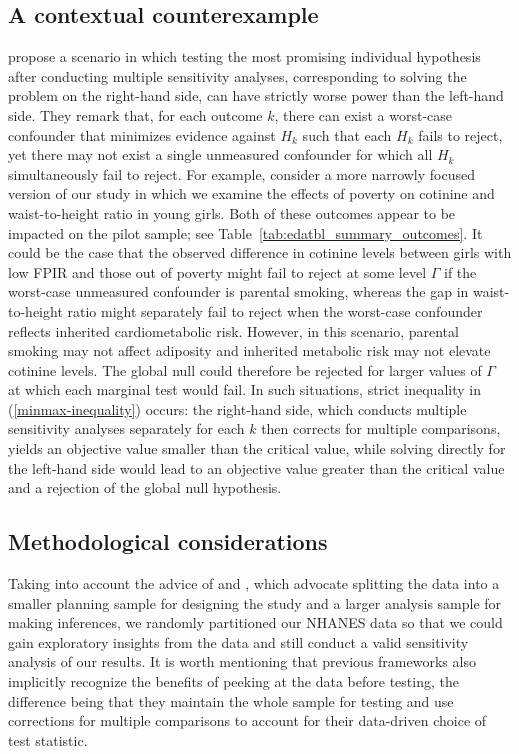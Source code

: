 \documentclass[12pt,leqno,titlepage]{amsart}
\newcommand{\1}{\mathbbm{1}}
\begin{document}
\begin{bibunit}
\subsection{A contextual counterexample}

\cite{fogarty2016sensitivity} propose a scenario in which testing the most promising individual hypothesis after conducting multiple sensitivity analyses, corresponding to solving the problem on the right-hand side, can have strictly worse power than the left-hand side. They remark that, for each outcome $k$, there can exist a worst-case confounder that minimizes evidence against $H_k$ such that each $H_k$ fails to reject, yet there may not exist a single unmeasured confounder for which all $H_k$ simultaneously fail to reject. For example, consider a more narrowly focused version of our study in which we examine the effects of poverty on cotinine and waist-to-height ratio in young girls. Both of these outcomes appear to be impacted on the pilot sample; see Table~\ref{tab:edatbl_summary_outcomes}. It could be the case that the observed difference in cotinine levels between girls with low FPIR and those out of poverty might fail to reject at some level $\Gamma$ if the worst-case unmeasured confounder is parental smoking, whereas the gap in waist-to-height ratio might separately fail to reject when the worst-case confounder reflects inherited cardiometabolic risk. However, in this scenario, parental smoking may not affect adiposity and inherited metabolic risk may not elevate cotinine levels. The global null could therefore be rejected for larger values of $\Gamma$ at which each marginal test would fail. In such situations, strict inequality in (\ref{minmax-inequality}) occurs: the right-hand side, which conducts multiple sensitivity analyses separately for each $k$ then corrects for multiple comparisons, yields an objective value smaller than the critical value, while solving directly for the left-hand side would lead to an objective value greater than the critical value and a rejection of the global null hypothesis.

\subsection{Methodological considerations}

Taking into account the advice of \cite{heller2009split} and \cite{small2024protocols}, which advocate splitting the data into a smaller planning sample for designing the study and a larger analysis sample for making inferences, we randomly partitioned our NHANES data so that we could gain exploratory insights from the data and still conduct a valid sensitivity analysis of our results. It is worth mentioning that previous frameworks also implicitly recognize the benefits of peeking at the data before testing, the difference being that they maintain the whole sample for testing and use corrections for multiple comparisons to account for their data-driven choice of test statistic.


\end{bibunit}
\end{document}
